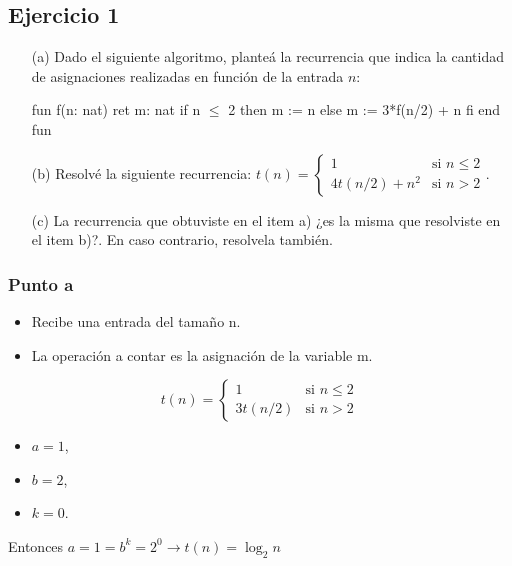 \subsection{Ejercicio 1}
\begin{itemize}
    \item[(a)] Dado el siguiente algoritmo, planteá la recurrencia que indica la cantidad de asignaciones realizadas en función de la entrada $n$:
\begin{codebox}
\begin{pascallike}
fun f(n: nat) ret m: nat
    if n $\leq$ 2 then
        m := n
    else 
        m := 3*f(n/2) + n
    fi
end fun
\end{pascallike}
\end{codebox}
    \item[(b)] Resolvé la siguiente recurrencia: $t(n) = \begin{cases} 1 & \text{si } n \leq 2 \\ 4t(n/2) + n^2 & \text{si } n > 2 \end{cases}$.
    \item[(c)] La recurrencia que obtuviste en el item a) ¿es la misma que resolviste en el item b)?. En caso contrario, resolvela también.
\end{itemize}

\subsubsection{Punto a}
\begin{itemize}
    \item Recibe una entrada del tamaño n.
    \item La operación a contar es la asignación de la variable m.
\end{itemize}

\begin{equation*}
    t(n) = \begin{cases}
        1 & \text{si } n \leq 2 \\
        3t(n/2) & \text{si } n > 2
    \end{cases}
\end{equation*}

\begin{itemize}
    \item $a = 1$,
    \item $b = 2$,
    \item $k = 0$.
\end{itemize}

Entonces $a = 1 = b^k = 2^0 \rightarrow t(n) = \log_2 n$

